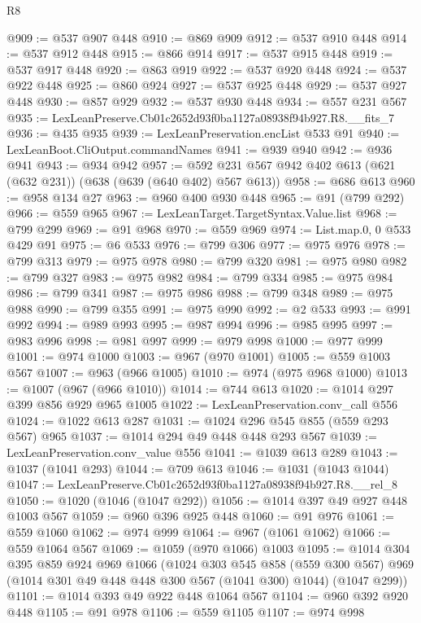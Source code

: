 \begin{lexlean}{R8}
\begin{coremodule}
@909 := @537 @907 @448
@910 := @869 @909
@912 := @537 @910 @448
@914 := @537 @912 @448
@915 := @866 @914
@917 := @537 @915 @448
@919 := @537 @917 @448
@920 := @863 @919
@922 := @537 @920 @448
@924 := @537 @922 @448
@925 := @860 @924
@927 := @537 @925 @448
@929 := @537 @927 @448
@930 := @857 @929
@932 := @537 @930 @448
@934 := @557 @231 @567
@935 := LexLeanPreserve.Cb01c2652d93f0ba1127a08938f94b927.R8.__fits_7
@936 := @435 @935
@939 := LexLeanPreservation.encList @533 @91
@940 := LexLeanBoot.CliOutput.commandNames
@941 := @939 @940
@942 := @936 @941
@943 := @934 @942
@957 := @592 @231 @567 @942 @402 @613 (@621 (@632 @231)) (@638 (@639 (@640 @402) @567 @613))
@958 := @686 @613
@960 := @958 @134 @27
@963 := @960 @400 @930 @448
@965 := @91 (@799 @292)
@966 := @559 @965
@967 := LexLeanTarget.TargetSyntax.Value.list
@968 := @799 @299
@969 := @91 @968
@970 := @559 @969
@974 := List.map.{0, 0} @533 @429 @91
@975 := @6 @533
@976 := @799 @306
@977 := @975 @976
@978 := @799 @313
@979 := @975 @978
@980 := @799 @320
@981 := @975 @980
@982 := @799 @327
@983 := @975 @982
@984 := @799 @334
@985 := @975 @984
@986 := @799 @341
@987 := @975 @986
@988 := @799 @348
@989 := @975 @988
@990 := @799 @355
@991 := @975 @990
@992 := @2 @533
@993 := @991 @992
@994 := @989 @993
@995 := @987 @994
@996 := @985 @995
@997 := @983 @996
@998 := @981 @997
@999 := @979 @998
@1000 := @977 @999
@1001 := @974 @1000
@1003 := @967 (@970 @1001)
@1005 := @559 @1003 @567
@1007 := @963 (@966 @1005)
@1010 := @974 (@975 @968 @1000)
@1013 := @1007 (@967 (@966 @1010))
@1014 := @744 @613
@1020 := @1014 @297 @399 @856 @929 @965 @1005
@1022 := LexLeanPreservation.conv_call @556
@1024 := @1022 @613 @287
@1031 := @1024 @296 @545 @855 (@559 @293 @567) @965
@1037 := @1014 @294 @49 @448 @448 @293 @567
@1039 := LexLeanPreservation.conv_value @556
@1041 := @1039 @613 @289
@1043 := @1037 (@1041 @293)
@1044 := @709 @613
@1046 := @1031 (@1043 @1044)
@1047 := LexLeanPreserve.Cb01c2652d93f0ba1127a08938f94b927.R8.__rel_8
@1050 := @1020 (@1046 (@1047 @292))
@1056 := @1014 @397 @49 @927 @448 @1003 @567
@1059 := @960 @396 @925 @448
@1060 := @91 @976
@1061 := @559 @1060
@1062 := @974 @999
@1064 := @967 (@1061 @1062)
@1066 := @559 @1064 @567
@1069 := @1059 (@970 @1066) @1003
@1095 := @1014
    @304
    @395
    @859
    @924
    @969
    @1066
    (@1024
      @303
      @545
      @858
      (@559 @300 @567)
      @969
      (@1014 @301 @49 @448 @448 @300 @567 (@1041 @300) @1044)
      (@1047 @299))
@1101 := @1014 @393 @49 @922 @448 @1064 @567
@1104 := @960 @392 @920 @448
@1105 := @91 @978
@1106 := @559 @1105
@1107 := @974 @998

\end{coremodule}
\end{lexlean}
